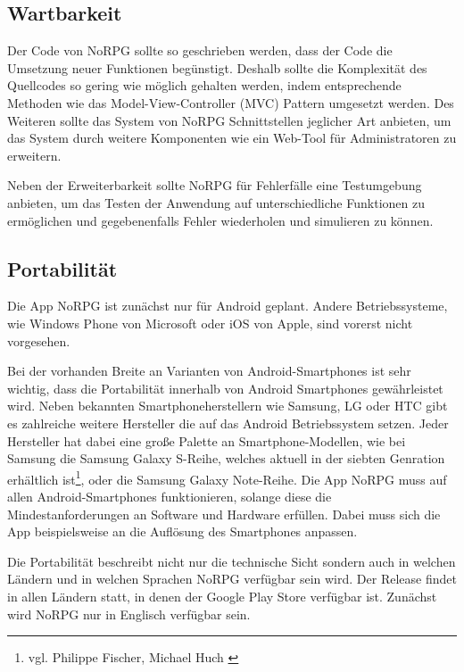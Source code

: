	\subsection{Wartbarkeit}
		Der Code von NoRPG sollte so geschrieben werden, dass der Code die Umsetzung neuer Funktionen begünstigt. Deshalb sollte die Komplexität des Quellcodes so gering wie möglich gehalten werden, indem entsprechende Methoden wie das Model-View-Controller (\ac{MVC}) Pattern umgesetzt werden. Des Weiteren sollte das System von NoRPG Schnittstellen jeglicher Art anbieten, um das System durch weitere Komponenten wie ein Web-Tool für Administratoren zu erweitern.
		
		Neben der Erweiterbarkeit sollte NoRPG für Fehlerfälle eine Testumgebung anbieten, um das Testen der Anwendung auf unterschiedliche Funktionen zu ermöglichen und gegebenenfalls Fehler wiederholen und simulieren zu können.
		
	\subsection{Portabilität}
		Die App NoRPG ist zunächst nur für Android geplant. Andere Betriebssysteme, wie Windows Phone von Microsoft oder iOS von Apple, sind vorerst nicht vorgesehen. 
		
		Bei der vorhanden Breite an Varianten von Android-Smartphones ist sehr wichtig, dass die Portabilität innerhalb von Android Smartphones gewährleistet wird. Neben bekannten Smartphoneherstellern wie Samsung, LG oder HTC gibt es zahlreiche weitere Hersteller die auf das Android Betriebssystem setzen. Jeder Hersteller hat dabei eine große Palette an Smartphone-Modellen, wie bei Samsung die Samsung Galaxy S-Reihe, welches aktuell in der siebten Genration erhältlich ist\footnote{vgl. Philippe Fischer, Michael Huch \cite{computerBildSamsung}}, oder die Samsung Galaxy Note-Reihe. Die App NoRPG muss auf allen Android-Smartphones funktionieren, solange diese die Mindestanforderungen an Software und Hardware erfüllen. Dabei muss sich die App beispielsweise an die Auflösung des Smartphones anpassen.
		
		Die Portabilität beschreibt nicht nur die technische Sicht sondern auch in welchen Ländern und in welchen Sprachen NoRPG verfügbar sein wird. Der Release findet in allen Ländern statt, in denen der Google Play Store verfügbar ist. Zunächst wird NoRPG nur in Englisch verfügbar sein.